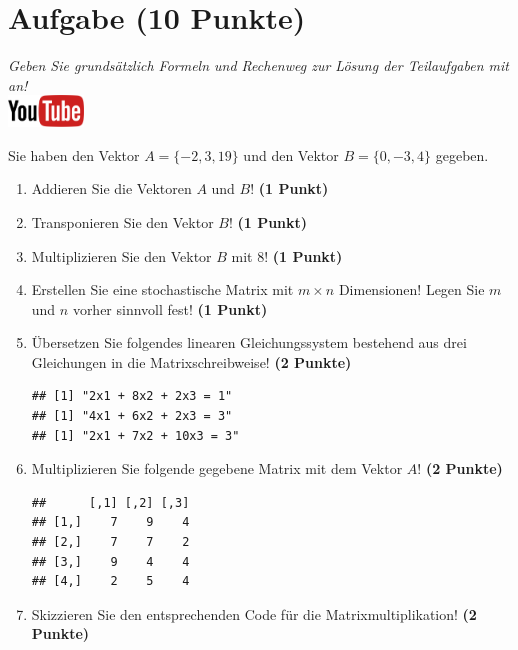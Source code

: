 \documentclass[a4paper, 10pt]{scrartcl}\usepackage[]{graphicx}\usepackage[]{xcolor}
\makeatletter
\newenvironment{kframe}{%
 \def\at@end@of@kframe{}%
 \ifinner\ifhmode%
  \def\at@end@of@kframe{\end{minipage}}%
  \begin{minipage}{\columnwidth}%
 \fi\fi%
 \def\FrameCommand##1{\hskip\@totalleftmargin \hskip-\fboxsep
 \colorbox{shadecolor}{##1}\hskip-\fboxsep
     \hskip-\linewidth \hskip-\@totalleftmargin \hskip\columnwidth}%
 \MakeFramed {\advance\hsize-\width
   \@totalleftmargin\z@ \linewidth\hsize
   \@setminipage}}%
 {\par\unskip\endMakeFramed%
 \at@end@of@kframe}
\newenvironment{knitrout}{}{} %
\makeatother
\begin{document}
 
\clearpage

\section{Aufgabe \hfill (10 Punkte)}

\textit{Geben Sie grunds{\"a}tzlich Formeln und Rechenweg zur L{\"o}sung der
  Teilaufgaben mit an!} \\[1Ex]

\hfill\href{https://youtu.be/x_MwWJoEsME}{\includegraphics[width =
  2cm]{img/youtube}} %
\hspace{2Ex}



Sie haben den Vektor $A = \{-2, 3, 19\}$ und den Vektor $B = \{0, -3, 4\}$ gegeben.

\begin{enumerate}
\item Addieren Sie die Vektoren $A$ und $B$! \textbf{(1 Punkt)}
\item Transponieren Sie den Vektor $B$!
  \textbf{(1 Punkt)} 
\item Multiplizieren Sie den Vektor $B$ mit
  $8$! \textbf{(1 Punkt)}
\item Erstellen Sie eine stochastische Matrix mit $m \times n$ Dimensionen!
  Legen Sie $m$ und $n$ vorher sinnvoll fest! \textbf{(1 Punkt)}
\item {\"U}bersetzen Sie folgendes linearen Gleichungssystem bestehend aus drei
  Gleichungen in die Matrixschreibweise! \textbf{(2 Punkte)}
\begin{knitrout}
\color{fgcolor}\begin{kframe}
\begin{verbatim}
## [1] "2x1 + 8x2 + 2x3 = 1"
## [1] "4x1 + 6x2 + 2x3 = 3"
## [1] "2x1 + 7x2 + 10x3 = 3"
\end{verbatim}
\end{kframe}
\end{knitrout}
\item Multiplizieren Sie folgende gegebene Matrix mit dem Vektor $A$!
  \textbf{(2 Punkte)}
\begin{knitrout}
\color{fgcolor}\begin{kframe}
\begin{verbatim}
##      [,1] [,2] [,3]
## [1,]    7    9    4
## [2,]    7    7    2
## [3,]    9    4    4
## [4,]    2    5    4
\end{verbatim}
\end{kframe}
\end{knitrout}
\item Skizzieren Sie den entsprechenden \Rlogo Code f{\"u}r die
  Matrixmultiplikation! \textbf{(2 Punkte)}
\end{enumerate}
\end{document}
